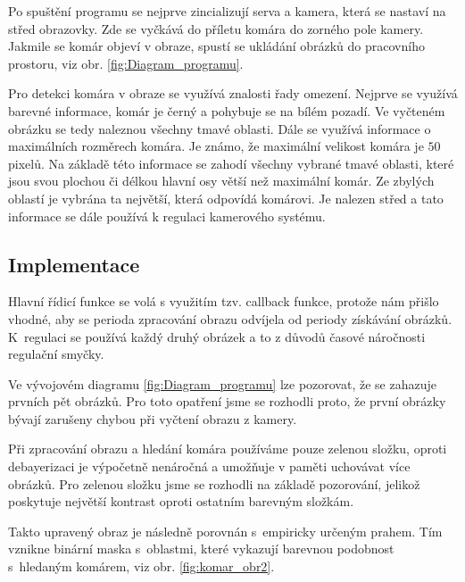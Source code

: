 \documentclass[a4paper,10pt]{article}
\begin{document}
		Po spuštění programu se nejprve zincializují serva a kamera, 
		která se nastaví na střed obrazovky.
		Zde se vyčkává do příletu komára do zorného pole kamery.
		Jakmile se komár objeví v obraze, spustí se ukládání obrázků do pracovního prostoru, viz obr. \ref{fig:Diagram_programu}.

		Pro detekci komára v obraze se využívá znalosti řady omezení. 
		Nejprve se využívá barevné informace, komár je černý a pohybuje se na bílém pozadí.
		Ve vyčteném obrázku se tedy naleznou všechny tmavé oblasti. 
		Dále se využívá informace o maximálních rozměrech komára. 
		Je známo, že maximální velikost komára je $50$ pixelů. 
		Na základě této informace se zahodí všechny vybrané tmavé oblasti, 
		které jsou svou plochou či délkou hlavní osy větší než maximální komár.
		Ze zbylých oblastí je vybrána ta největší, která odpovídá komárovi.
		Je nalezen střed a tato informace se dále používá k regulaci kamerového systému.

\subsection{Implementace}

		Hlavní řídicí funkce se volá s využitím tzv. callback funkce, protože nám přišlo vhodné, 
		aby se perioda zpracování obrazu odvíjela od periody získávání obrázků.		
		K~regulaci se používá každý druhý obrázek a to z důvodů časové náročnosti regu\-lační smyčky.

		Ve vývojovém diagramu \ref{fig:Diagram_programu} lze pozorovat, že se zahazuje prvních pět obrázků.
		Pro toto opatření jsme se rozhodli proto, 
		že první obrázky bývají zarušeny chybou při vyčtení obrazu z kamery.

		Při zpracování obrazu a hledání komára používáme pouze zelenou složku,
		oproti debayerizaci je výpočetně nenáročná a 
		umožňuje v paměti uchovávat více obrázků. Pro zelenou složku jsme se rozhodli na základě pozorování, 
		jelikož poskytuje největší kontrast oproti ostatním barevným složkám.

		Takto upravený obraz je následně porovnán s~empiricky určeným prahem.
		Tím vznikne binární maska s~oblastmi, které vykazují barevnou podobnost s~hle\-da\-ným komárem, viz obr. \ref{fig:komar_obr2}.
\end{document}
